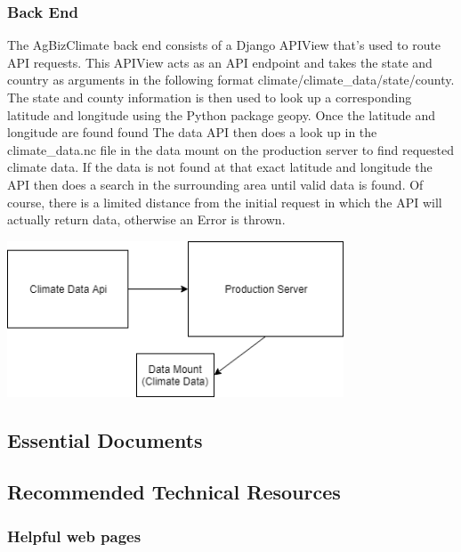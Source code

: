 \documentclass[onecolumn, draftclsnofoot,10pt, compsoc]{article}
\begin{document}
        \subsubsection{Back End}
        The AgBizClimate back end consists of a Django APIView that's used to route API requests. This APIView acts as an API endpoint and takes the state and country as arguments in the following format climate/climate\_data/state/county. The state and county information is then used to look up a corresponding latitude and longitude using the Python package geopy. Once the latitude and longitude are found found The data API then does a look up in the climate\_data.nc file in the data mount on the production server to find requested climate data. If the data is not found at that exact latitude and longitude the API then does a search in the surrounding area until valid data is found. Of course, there is a limited distance from the initial request in which the API will actually return data, otherwise an Error is thrown.
        \begin{center}
        \includegraphics[width=10cm]{./Images/backend.png}
        \end{center}
        
        
 
    \subsection{Essential Documents}
            

    \subsection{Recommended Technical Resources}
        \subsubsection{Helpful web pages}
\end{document}
